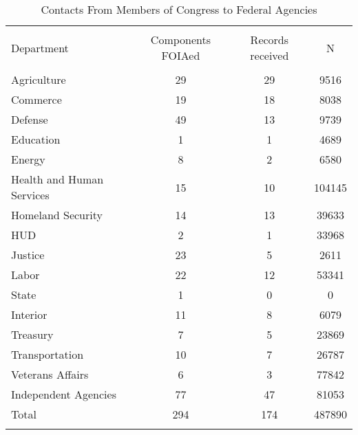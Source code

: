 
\begin{table}[!htbp] \centering 
  \caption{Contacts From Members of Congress to Federal Agencies} 
  \label{responserates} 
\begin{tabular}{lccc} 
\\[-1.8ex]\hline \\[-1.8ex] 
Department & Components FOIAed & Records received &  N \\ 
\hline \\[-1.8ex] 
Agriculture & 29 & 29 &  9516 \\ 
Commerce & 19 & 18 &  8038 \\ 
Defense & 49 & 13 & 9739 \\ 
Education & 1 & 1 &  4689 \\ 
Energy & 8 & 2 &  6580 \\ 
Health and Human Services & 15 & 10 &  104145 \\ 
Homeland Security & 14 & 13 &  39633 \\ 
HUD & 2 & 1 &  33968 \\ 
Justice & 23 & 5 &  2611 \\ 
Labor & 22 & 12 &  53341 \\ 
State & 1 & 0 &  0 \\ 
Interior & 11 & 8 &  6079 \\ 
Treasury & 7 & 5 &  23869 \\ 
Transportation & 10 & 7 &  26787 \\ 
Veterans Affairs & 6 & 3 &  77842 \\ 
Independent Agencies & 77 & 47 &  81053 \\ 
\hline
Total & 294 & 174 &  487890 \\ 
\hline \\[-1.8ex] 
\end{tabular} 
\end{table} 
